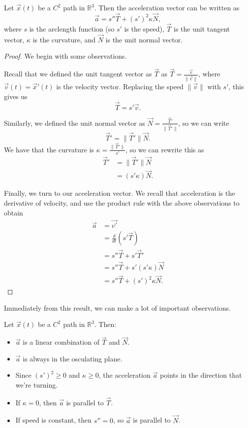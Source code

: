 \documentclass{ximera}
\begin{document}
\begin{proposition}
Let $\vec{x}(t)$ be a $C^2$ path in $\mathbb{R}^3$. Then the acceleration vector can be written as
\[
\vec{a} = s''\vec{T} + (s')^2\kappa\vec{N},
\]
where $s$ is the arclength function (so $s'$ is the speed), $\vec{T}$ is the unit tangent vector, $\kappa$ is the curvature, and $\vec{N}$ is the unit normal vector.
\end{proposition} 

\begin{proof}
We begin with some observations.

Recall that we defined the unit tangent vector as $\vec{T}$ as $\vec{T}=\frac{\vec{v}}{\|\vec{v}\|}$, where $\vec{v}(t) = \vec{x}'(t)$ is the velocity vector. Replacing the speed $\|\vec{v}\|$ with $s'$, this gives us
\[
\vec{T} = s'\vec{v}.
\]

Similarly, we defined the unit normal vector as $\vec{N}=\frac{\vec{T}'}{\|\vec{T}'\|}$, so we can write
\[
\vec{T}' = \|\vec{T}'\|\vec{N}.
\]
We have that the curvature is $\kappa = \frac{\|\vec{T}'\|}{s'}$, so we can rewrite this as
\begin{align*}
\vec{T}' &= \|\vec{T}'\|\vec{N}\\
&= (s'\kappa)\vec{N}.
\end{align*}

Finally, we turn to our acceleration vector. We recall that acceleration is the derivative of velocity, and use the product rule with the above observations to obtain
\begin{align*}
\vec{a} &= \vec{v'}\\
&= \frac{d}{dt}(s'\vec{T})\\
&= s''\vec{T} + s'\vec{T}'\\
&= s''\vec{T} + s'(s'\kappa)\vec{N}\\
&= s''\vec{T} + (s')^2\kappa\vec{N}.
\end{align*}
\end{proof}

Immediately from this result, we can make a lot of important observations.

\begin{proposition}
Let $\vec{x}(t)$ be a $C^2$ path in $\mathbb{R}^3$. Then:
\begin{itemize}
\item $\vec{a}$ is a linear combination of $\vec{T}$ and $\vec{N}$.
\item $\vec{a}$ is always in the osculating plane.
\item Since $(s')^2\geq 0$ and $\kappa\geq 0$, the acceleration $\vec{a}$ points in the direction that we're turning.
\item If $\kappa = 0$, then $\vec{a}$ is parallel to $\vec{T}$.
\item If speed is constant, then $s''=0$, so $\vec{a}$ is parallel to $\vec{N}$.
\end{itemize}
\end{proposition}
\end{document}
